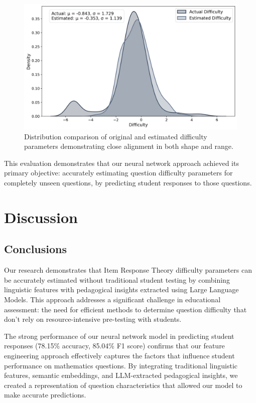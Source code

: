\documentclass[11pt]{article}
\begin{document}
\begin{figure}[!ht] %
  \centering
    \includegraphics[width=1\columnwidth]{../../one_model_experiment/figures/difficulty_distributions.png}
    \caption{Distribution comparison of original and estimated difficulty parameters demonstrating close alignment in both shape and range.}
    \label{fig:difficulty-distribution}
\end{figure}

This evaluation demonstrates that our neural network approach achieved its primary objective: accurately estimating question difficulty parameters for completely unseen questions, by predicting student responses to those questions.

\section{Discussion}

\subsection{Conclusions}

Our research demonstrates that Item Response Theory difficulty parameters can be accurately estimated without traditional student testing by combining linguistic features with pedagogical insights extracted using Large Language Models. This approach addresses a significant challenge in educational assessment: the need for efficient methods to determine question difficulty that don't rely on resource-intensive pre-testing with students.

The strong performance of our neural network model in predicting student responses (78.15\% accuracy, 85.04\% F1 score) confirms that our feature engineering approach effectively captures the factors that influence student performance on mathematics questions. By integrating traditional linguistic features, semantic embeddings, and LLM-extracted pedagogical insights, we created a representation of question characteristics that allowed our model to make accurate predictions.
\end{document}
